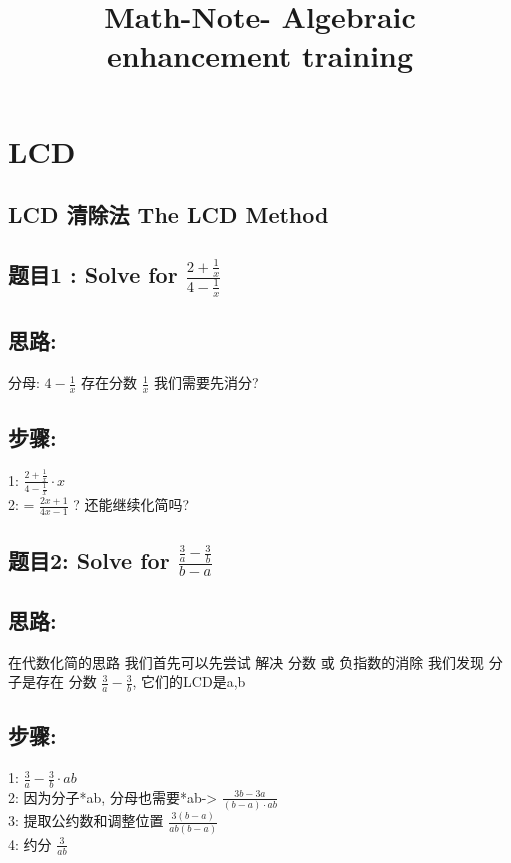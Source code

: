 \documentclass[12pt]{article}
\title{Math-Note- Algebraic enhancement training}
\date{}
\begin{document}
\maketitle

\section{LCD}
\subsection*{LCD 清除法 The LCD Method}
\subsection*{题目1 : Solve for $\frac{2 + \frac{1}{x}}{4 -\frac{1}{x}}$}

\subsection*{思路:}
分母:  $4 - \frac{1}{x}$  存在分数 $\frac{1}{x}$
我们需要先消分?

\subsection*{步骤:}
1:  $\frac{2 + \frac{1}{x}}{4 -\frac{1}{x}} \cdot x $   \\
2:  = $\frac{2x + 1}{4x - 1}$ ? 还能继续化简吗? 

\subsection*{题目2: Solve for  $\frac{\frac{3}{a}-\frac{3}{b}}{b-a}$}

\subsection*{思路:}
在代数化简的思路 我们首先可以先尝试 解决 分数 或 负指数的消除
我们发现 分子是存在 分数 $\frac{3}{a}-\frac{3}{b}$, 它们的LCD是a,b

\subsection*{步骤:}
1:  $\frac{3}{a}-\frac{3}{b} \cdot ab$ \\
2:  因为分子*ab, 分母也需要*ab-> $\frac{3b -3a}{(b-a)\cdot ab}$ \\
3:  提取公约数和调整位置  $\frac{3(b-a)}{ab(b-a)}$ \\
4:  约分  $\frac{3}{ab}$ \\
\end{document}
